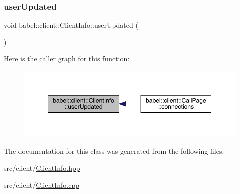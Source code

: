 \subsubsection{\texorpdfstring{user\+Updated}{userUpdated}}
{\footnotesize\ttfamily void babel\+::client\+::\+Client\+Info\+::user\+Updated (\begin{DoxyParamCaption}{ }\end{DoxyParamCaption})\hspace{0.3cm}{\ttfamily [signal]}}

Here is the caller graph for this function\+:\nopagebreak
\begin{figure}[H]
\begin{center}
\leavevmode
\includegraphics[width=349pt]{classbabel_1_1client_1_1_client_info_a20070f1abc949a58f2e532edd4f32f0c_icgraph}
\end{center}
\end{figure}


The documentation for this class was generated from the following files\+:\begin{DoxyCompactItemize}
\item 
src/client/\mbox{\hyperlink{_client_info_8hpp}{Client\+Info.\+hpp}}\item 
src/client/\mbox{\hyperlink{_client_info_8cpp}{Client\+Info.\+cpp}}\end{DoxyCompactItemize}
